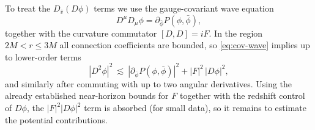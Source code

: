 \documentclass[11pt]{article}
\numberwithin{equation}{section}
\theoremstyle{plain}
\theoremstyle{definition}
\theoremstyle{remark}
\begin{document}
To treat the $D_{\hat v}(D\phi)$ terms we use the gauge-covariant wave equation
\begin{equation}\label{eq:cov-wave}
D^{\mu}D_{\mu}\phi = \partial_{\bar\phi}P(\phi,\bar\phi),
\end{equation}
together with the curvature commutator $[D,D]=iF$.
In the region $2M<r\le 3M$ all connection coefficients are bounded, so \eqref{eq:cov-wave} implies up to lower-order terms
\begin{equation}
|D^{2}\phi|^{2}\ \lesssim\ |\partial_{\bar\phi}P(\phi,\bar\phi)|^{2} + |F|^{2}\,|D\phi|^{2},
\end{equation}
and similarly after commuting with up to two angular derivatives.
Using the already established near-horizon bounds for $F$ together with the redshift control of $D\phi$, the $|F|^{2}|D\phi|^{2}$ term is absorbed (for small data), so it remains to estimate the potential contributions.
\end{document}
